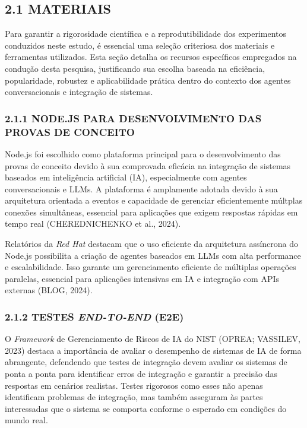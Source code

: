 \documentclass[
]{article}
\begin{document}
\subsection{2.1 MATERIAIS}\label{materiais}

Para garantir a rigorosidade científica e a reprodutibilidade dos
experimentos conduzidos neste estudo, é essencial uma seleção criteriosa
dos materiais e ferramentas utilizados. Esta seção detalha os recursos
específicos empregados na condução desta pesquisa, justificando sua
escolha baseada na eficiência, popularidade, robustez e aplicabilidade
prática dentro do contexto dos agentes conversacionais e integração de
sistemas.

\subsubsection{2.1.1 NODE.JS PARA DESENVOLVIMENTO DAS PROVAS DE
CONCEITO}\label{node.js-para-desenvolvimento-das-provas-de-conceito}

Node.js foi escolhido como plataforma principal para o desenvolvimento
das provas de conceito devido à sua comprovada eficácia na integração de
sistemas baseados em inteligência artificial (IA), especialmente com
agentes conversacionais e LLMs. A plataforma é amplamente adotada devido
à sua arquitetura orientada a eventos e capacidade de gerenciar
eficientemente múltplas conexões simultâneas, essencial para aplicações
que exigem respostas rápidas em tempo real (CHEREDNICHENKO et al.,
2024).

Relatórios da \emph{Red Hat} destacam que o uso eficiente da arquitetura
assíncrona do Node.js possibilita a criação de agentes baseados em LLMs
com alta performance e escalabilidade. Isso garante um gerenciamento
eficiente de múltiplas operações paralelas, essencial para aplicações
intensivas em IA e integração com APIs externas (BLOG, 2024).

\subsubsection{\texorpdfstring{2.1.2 TESTES \emph{END-TO-END}
(E2E)}{2.1.2 TESTES END-TO-END (E2E)}}\label{testes-end-to-end-e2e}

O \emph{Framework} de Gerenciamento de Riscos de IA do NIST (OPREA;
VASSILEV, 2023) destaca a importância de avaliar o desempenho de
sistemas de IA de forma abrangente, defendendo que testes de integração
devem avaliar os sistemas de ponta a ponta para identificar erros de
integração e garantir a precisão das respostas em cenários realistas.
Testes rigorosos como esses não apenas identificam problemas de
integração, mas também asseguram às partes interessadas que o sistema se
comporta conforme o esperado em condições do mundo real.
\end{document}
